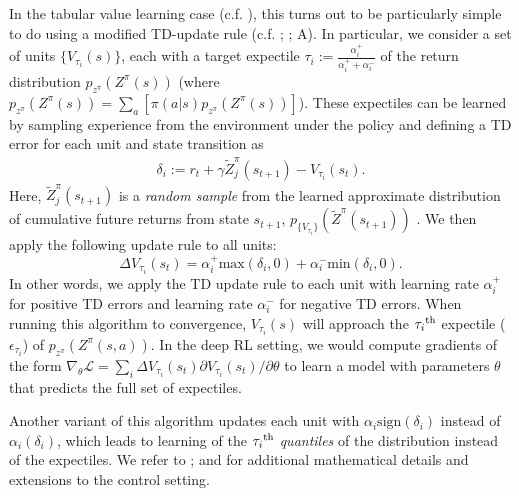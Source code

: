 In the tabular value learning case (c.f. ), this turns out to be particularly simple to do using a modified TD-update rule (c.f. ; \citealp{lowet2020distributional}; A).
In particular, we consider a set of units $\{ V_{\tau_i}(s) \}$, each with a target expectile $\tau_i := \frac{\alpha_i^+}{\alpha_i^+ + \alpha_i^-}$ of the return distribution $p_{z^\pi}(Z^\pi(s))$ (where $p_{z^\pi}(Z^\pi(s)) = \sum_a \left [ \pi(a|s) p_{z^\pi}(Z^\pi(s)) \right ] $).
These expectiles can be learned by sampling experience from the environment under the policy and defining a TD error for each unit and state transition as
\begin{align}
    \delta_i := r_t + \gamma \tilde{Z}^\pi_j(s_{t+1}) - V_{\tau_i}(s_t).
\end{align}
Here, $\tilde{Z}^\pi_j(s_{t+1})$ is a \emph{random sample} from the learned approximate distribution of cumulative future returns from state $s_{t+1}$, $p_{\{ V_{\tau_i} \} }(\tilde{Z}^\pi(s_{t+1}))$ \citep{lowet2020distributional,dabney2020distributional}.
We then apply the following update rule to all units:
\begin{equation}
    \label{eq:DRL_V_expec}
    \Delta V_{\tau_i}(s_t) = \alpha_i^+ \text{max}(\delta_i, 0 ) + \alpha_i^- \text{min}(\delta_i, 0).
\end{equation}
In other words, we apply the TD update rule to each unit with learning rate $\alpha_i^+$ for positive TD errors and learning rate $\alpha_i^-$ for negative TD errors.
When running this algorithm to convergence, $V_{\tau_i}(s)$ will approach the $\tau_i\textsuperscript{th}$ expectile ($\epsilon_{\tau_i}$) of $p_{z^\pi}(Z^\pi(s, a))$.
In the deep RL setting, we would compute gradients of the form $\nabla_\theta \mathcal{L} = \sum_i \Delta V_{\tau_i}(s_t) \partial V_{\tau_i}(s_t) / \partial \theta$ to learn a model with parameters $\theta$ that predicts the full set of expectiles.

Another variant of this algorithm updates each unit with $\alpha_i \text{sign}(\delta_i)$ instead of $\alpha_i (\delta_i)$, which leads to learning of the $\tau_i\textsuperscript{th}$ \emph{quantiles} of the distribution instead of the expectiles.
We refer to \citet{bellemare2017distributional,dabney2018distributional,rowland2019statistics,bellemare2023distributional}; and \citet{dabney2020distributional} for additional mathematical details and extensions to the control setting.



